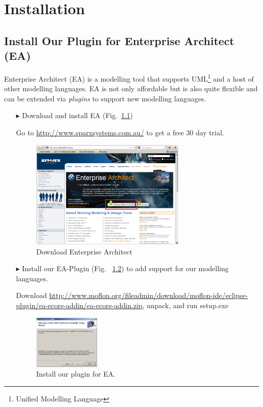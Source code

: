 \chapter{Installation}
\label{chap:installation}

\section{Install Our Plugin for Enterprise Architect (EA)}
Enterprise Architect (EA) is a modelling tool that supports
UML\footnote{Unified Modelling Language} and a host of other modelling
languages.  EA is not only affordable but is also quite flexible and can be
extended via \emph{plugins} to support new modelling languages.
\vspace{-0.1cm}
\begin{enumerate}
\item[$\blacktriangleright$] Download and install EA
(Fig.~\ref{fig_enterpriseArchitextHomepage})
\item[] Go to \url{http://www.sparxsystems.com.au/} to get a free 30 day trial.
\begin{figure}[!h]
	\centering
  \includegraphics[width=0.7\textwidth]{pics/ea_download.png}
	\caption{Download Enterprise Architect}
	\label{fig_enterpriseArchitextHomepage}
\end{figure} 

\newpage

\item[$\blacktriangleright$] Install our EA-Plugin (Fig.~
\ref{fig_eaPluginWizard}) to add support for our modelling languages.
\item[] Download
\url{http://www.moflon.org/fileadmin/download/moflon-ide/eclipse-plugin/ea-ecore-addin/ea-ecore-addin.zip},
unpack, and run setup.exe
\begin{figure}[!h]
	\centering
  \includegraphics[width=0.3\textwidth]{pics/eaplugin_install.png}
	\caption{Install our plugin for EA.}
	\label{fig_eaPluginWizard}
\end{figure}
\end{enumerate}
\vspace{-1cm}

